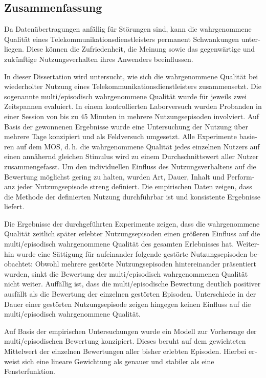 \begin{otherlanguage}{ngerman}
\chapter*{Zusammenfassung}
Da Datenübertragungen anfällig für Störungen sind, kann die wahrgenommene Qualität eines Telekommunikationsdienstleisters permanent Schwankungen unterliegen.
Diese können die Zufriedenheit, die Meinung sowie das gegenwärtige und zukünftige Nutzungsverhalten ihres Anwenders beeinflussen. 

In dieser Dissertation wird untersucht, wie sich die wahrgenommene Qualität bei wiederholter Nutzung eines Telekommunikationsdienstleisters zusammensetzt.
Die sogenannte multi\-/episodisch wahrgenommene Qualität wurde für jeweils zwei Zeitspannen evaluiert.
In einem kontrollierten Laborversuch wurden Probanden in einer Session von bis zu 45 Minuten in mehrere Nutzungsepisoden involviert.
Auf Basis der gewonnenen Ergebnisse wurde eine Untersuchung der Nutzung über mehrere Tage konzipiert und als Feldversuch umgesetzt.
Alle Experimente basieren auf dem \acf{MOS}, d.\,h. die wahrgenommene Qualität jedes einzelnen Nutzers auf einen annähernd gleichen Stimulus wird zu einem Durchschnittswert aller Nutzer zusammengefasst. 
Um den individuellen Einfluss des Nutzungsverhaltens auf die Bewertung möglichst gering zu halten, wurden Art, Dauer, Inhalt und Performanz jeder Nutzungsepisode streng definiert.
Die empirischen Daten zeigen, dass die Methode der definierten Nutzung durchführbar ist und konsistente Ergebnisse liefert.

Die Ergebnisse der durchgeführten Experimente zeigen, dass die wahrgenommene Qualität zeitlich später erlebter Nutzungsepisoden einen größeren Einfluss auf die multi\-/episodisch wahrgenommene Qualität des gesamten Erlebnisses hat.
Weiterhin wurde eine Sättigung für aufeinander folgende gestörte Nutzungsepisoden beobachtet: Obwohl mehrere gestörte Nutzungsepisoden hintereinander präsentiert wurden, sinkt die Bewertung der multi\-/episodisch wahrgenommenen Qualität nicht weiter.
Auffällig ist, dass die multi\-/episodische Bewertung deutlich positiver ausfällt als die Bewertung der einzelnen gestörten Episoden.
Unterschiede in der Dauer einer gestörten Nutzungsepisode zeigen hingegen keinen Einfluss auf die multi\-/episodisch wahrgenommene Qualität. 


Auf Basis der empirischen Untersuchungen wurde ein Modell zur Vorhersage der multi\-/episodischen Bewertung konzipiert.
Dieses beruht auf dem gewichteten Mittelwert der einzelnen Bewertungen aller bisher erlebten Episoden.
Hierbei erweist sich eine lineare Gewichtung als genauer und stabiler als eine Fensterfunktion. 

\end{otherlanguage}
